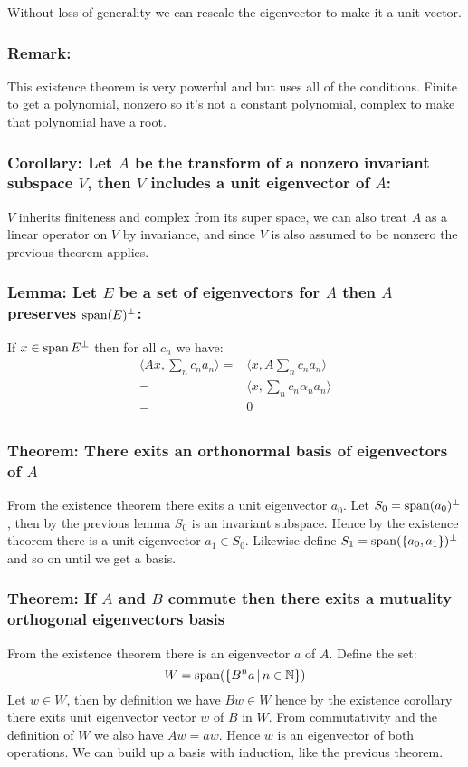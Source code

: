 Without loss of generality we can rescale the eigenvector to make it a unit vector.

\subsubsection{Remark:}
This existence theorem is very powerful and but uses all of the conditions.
Finite to get a polynomial, nonzero so it's not a constant polynomial, complex to make that polynomial have a root.

\subsubsection{Corollary: Let $A$ be the transform of a nonzero invariant subspace $V$, then $V$ includes a unit eigenvector of $A$:}
$V$ inherits finiteness and complex from its super space,
we can also treat $A$ as a linear operator on $V$ by invariance,
and since $V$ is also assumed to be nonzero the previous theorem applies.

\subsubsection{Lemma: Let $E$ be a set of eigenvectors for $A$ then $A$ preserves $\operatorname{span}(E)^\perp$:}
If $x\in\operatorname{span}{E}^\perp$ then for all $c_n$ we have:
\begin{equation*}
\begin{aligned}
	\langle Ax, \sum_n c_na_n\rangle =& \langle x, A\sum_n c_na_n\rangle\\
	=& \langle x, \sum_n c_n\alpha_na_n\rangle\\
	=&0 \\
\end{aligned}
\end{equation*}

\subsubsection{Theorem: There exits an orthonormal basis of eigenvectors of $A$}
From the existence theorem there exits a unit eigenvector $a_0$.
Let $S_0 = \operatorname{span}({a_0})^\perp$, then by the previous lemma $S_0$ is an invariant subspace.
Hence by the existence theorem there is a unit eigenvector $a_1\in S_0$.
Likewise define $S_1 = \operatorname{span}(\{a_0,a_1\})^\perp$ and so on until we get a basis.

\subsubsection{Theorem: If $A$ and $B$ commute then there exits a mutuality orthogonal eigenvectors basis}
From the existence theorem there is an eigenvector $a$ of $A$.
Define the set:
\[W = \operatorname{span}(\{B^na\,|\,n\in\mathbb{N}\})\]
Let $w\in W$, then by definition we have $Bw\in W$ hence by the existence corollary there exits unit eigenvector vector $w$ of $B$ in $W$.
From commutativity and the definition of $W$ we also have $Aw=aw$.
Hence $w$ is an eigenvector of both operations.
We can build up a basis with induction,
like the previous theorem.

